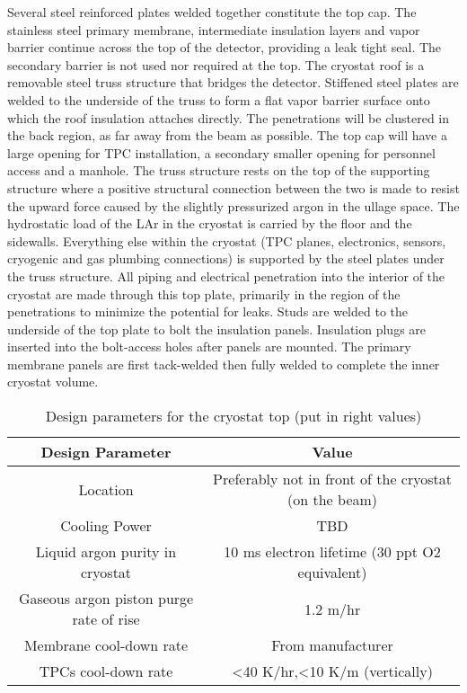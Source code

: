 Several steel reinforced plates welded together constitute the top cap. The stainless steel primary membrane, intermediate insulation layers and vapor barrier continue across the top of the detector, providing a leak tight seal. The secondary barrier is not used nor required at the top. The cryostat roof is a removable steel truss structure that bridges the detector. Stiffened steel plates are welded to the underside of the truss to form a flat vapor barrier surface onto which the roof insulation attaches directly. The penetrations will be clustered in the back region, as far away from the beam as possible. The top cap will have a large opening for TPC installation, a secondary smaller opening for personnel access and a manhole.
The truss structure rests on the top of the supporting structure where a positive structural connection between the two is made to resist the upward force caused by the slightly pressurized argon in the ullage space. The hydrostatic load of the LAr in the cryostat is carried by the floor and the sidewalls. Everything else within the cryostat (TPC planes, electronics, sensors, cryogenic and gas plumbing connections) is supported by the steel plates under the truss structure. All piping and electrical penetration into the interior of the cryostat are made through this top plate, primarily in the region of the penetrations to minimize the potential for leaks. Studs are welded to the underside of the top plate to bolt the insulation panels. Insulation plugs are inserted into the bolt-access holes after panels are mounted. The primary membrane panels are first tack-welded then fully welded to complete the inner cryostat volume.

\begin{table}[htpb]
\caption{Design parameters for the cryostat top (put in right values)}
\label{tbl:cryostat-top-parameters}
\centering
\begin{tabular}[htbp]{cc}
\hline
 Design Parameter & Value \\ \hline
 Location & Preferably not in front of the cryostat (on the beam) \\ \hline
 Cooling Power & TBD  \\ \hline
 Liquid argon purity in cryostat & 10 ms electron lifetime (30 ppt O2 equivalent) \\ 
 Gaseous argon piston purge rate of rise & 1.2 m/hr \\ \hline
 Membrane cool-down rate & From manufacturer \\  \hline
 TPCs cool-down rate & <40 K/hr,<10 K/m (vertically)
 \\ \hline
\end{tabular}
\end{table}

